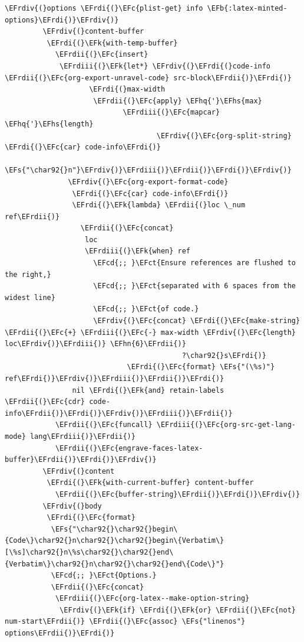 \documentclass{scrartcl}
\newcommand{\EFk}[1]{\textcolor{EFk}{#1}} %
\newcommand{\EFs}[1]{\textcolor{EFs}{#1}} %
\newcommand{\EFb}[1]{\textcolor{EFb}{#1}} %
\newcommand{\EFct}[1]{\textcolor{EFct}{#1}} %
\newcommand{\EFc}[1]{\textcolor{EFc}{#1}} %
\newcommand{\EFcd}[1]{\textcolor{EFcd}{#1}} %
\newcommand{\EFhn}[1]{\textcolor{EFhn}{\textbf{#1}}} %
\newcommand{\EFhq}[1]{\textcolor{EFhq}{#1}} %
\newcommand{\EFhs}[1]{\textcolor{EFhs}{#1}} %
\newcommand{\EFrdi}[1]{\textcolor{EFrdi}{#1}} %
\newcommand{\EFrdii}[1]{\textcolor{EFrdii}{#1}} %
\newcommand{\EFrdiii}[1]{\textcolor{EFrdiii}{#1}} %
\newcommand{\EFrdiv}[1]{\textcolor{EFrdiv}{#1}} %
\begin{document}
\begin{Code}
\begin{Verbatim}[]
         \EFrdiv{(}options \EFrdi{(}\EFc{plist-get} info \EFb{:latex-minted-options}\EFrdi{)}\EFrdiv{)}
         \EFrdiv{(}content-buffer
          \EFrdi{(}\EFk{with-temp-buffer}
            \EFrdii{(}\EFc{insert}
             \EFrdiii{(}\EFk{let*} \EFrdiv{(}\EFrdi{(}code-info \EFrdii{(}\EFc{org-export-unravel-code} src-block\EFrdii{)}\EFrdi{)}
                    \EFrdi{(}max-width
                     \EFrdii{(}\EFc{apply} \EFhq{'}\EFhs{max}
                            \EFrdiii{(}\EFc{mapcar} \EFhq{'}\EFhs{length}
                                    \EFrdiv{(}\EFc{org-split-string} \EFrdi{(}\EFc{car} code-info\EFrdi{)}
                                                      \EFs{"\char92{}n"}\EFrdiv{)}\EFrdiii{)}\EFrdii{)}\EFrdi{)}\EFrdiv{)}
               \EFrdiv{(}\EFc{org-export-format-code}
                \EFrdi{(}\EFc{car} code-info\EFrdi{)}
                \EFrdi{(}\EFk{lambda} \EFrdii{(}loc \_num ref\EFrdii{)}
                  \EFrdii{(}\EFc{concat}
                   loc
                   \EFrdiii{(}\EFk{when} ref
                     \EFcd{;; }\EFct{Ensure references are flushed to the right,}
                     \EFcd{;; }\EFct{separated with 6 spaces from the widest line}
                     \EFcd{;; }\EFct{of code.}
                     \EFrdiv{(}\EFc{concat} \EFrdi{(}\EFc{make-string} \EFrdii{(}\EFc{+} \EFrdiii{(}\EFc{-} max-width \EFrdiv{(}\EFc{length} loc\EFrdiv{)}\EFrdiii{)} \EFhn{6}\EFrdii{)}
                                          ?\char92{}s\EFrdi{)}
                             \EFrdi{(}\EFc{format} \EFs{"(\%s)"} ref\EFrdi{)}\EFrdiv{)}\EFrdiii{)}\EFrdii{)}\EFrdi{)}
                nil \EFrdi{(}\EFk{and} retain-labels \EFrdii{(}\EFc{cdr} code-info\EFrdii{)}\EFrdi{)}\EFrdiv{)}\EFrdiii{)}\EFrdii{)}
            \EFrdii{(}\EFc{funcall} \EFrdiii{(}\EFc{org-src-get-lang-mode} lang\EFrdiii{)}\EFrdii{)}
            \EFrdii{(}\EFc{engrave-faces-latex-buffer}\EFrdii{)}\EFrdi{)}\EFrdiv{)}
         \EFrdiv{(}content
          \EFrdi{(}\EFk{with-current-buffer} content-buffer
            \EFrdii{(}\EFc{buffer-string}\EFrdii{)}\EFrdi{)}\EFrdiv{)}
         \EFrdiv{(}body
          \EFrdi{(}\EFc{format}
           \EFs{"\char92{}\char92{}begin\{Code\}\char92{}n\char92{}\char92{}begin\{Verbatim\}[\%s]\char92{}n\%s\char92{}\char92{}end\{Verbatim\}\char92{}n\char92{}\char92{}end\{Code\}"}
           \EFcd{;; }\EFct{Options.}
           \EFrdii{(}\EFc{concat}
            \EFrdiii{(}\EFc{org-latex--make-option-string}
             \EFrdiv{(}\EFk{if} \EFrdi{(}\EFk{or} \EFrdii{(}\EFc{not} num-start\EFrdii{)} \EFrdii{(}\EFc{assoc} \EFs{"linenos"} options\EFrdii{)}\EFrdi{)}

\end{Verbatim}
\end{Code}
\end{document}
